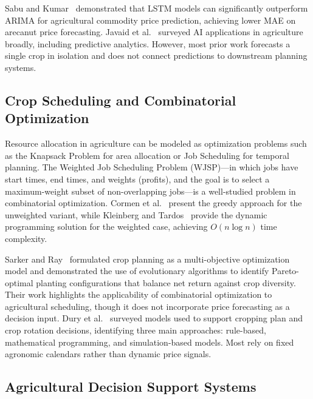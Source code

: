 \documentclass[journal]{IEEEtran}
\begin{document}
Sabu and Kumar~\cite{rohan2025crop} demonstrated that LSTM models can significantly outperform ARIMA for agricultural commodity price prediction, achieving lower MAE on arecanut price forecasting. Javaid et al.~\cite{javaid2023ai} surveyed AI applications in agriculture broadly, including predictive analytics. However, most prior work forecasts a single crop in isolation and does not connect predictions to downstream planning systems.

\vfill
\newpage

\subsection{Crop Scheduling and Combinatorial Optimization}

Resource allocation in agriculture can be modeled as optimization problems such as the Knapsack Problem for area allocation or Job Scheduling for temporal planning. The Weighted Job Scheduling Problem (WJSP)---in which jobs have start times, end times, and weights (profits), and the goal is to select a maximum-weight subset of non-overlapping jobs---is a well-studied problem in combinatorial optimization. Cormen et al.~\cite{clrs2009} present the greedy approach for the unweighted variant, while Kleinberg and Tardos~\cite{kleinberg2005} provide the dynamic programming solution for the weighted case, achieving $O(n \log n)$ time complexity.

Sarker and Ray~\cite{sarker2009crop} formulated crop planning as a multi-objective optimization model and demonstrated the use of evolutionary algorithms to identify Pareto-optimal planting configurations that balance net return against crop diversity. Their work highlights the applicability of combinatorial optimization to agricultural scheduling, though it does not incorporate price forecasting as a decision input. Dury et al.~\cite{dury2012crop} surveyed models used to support cropping plan and crop rotation decisions, identifying three main approaches: rule-based, mathematical programming, and simulation-based models. Most rely on fixed agronomic calendars rather than dynamic price signals.

\subsection{Agricultural Decision Support Systems}
\end{document}
